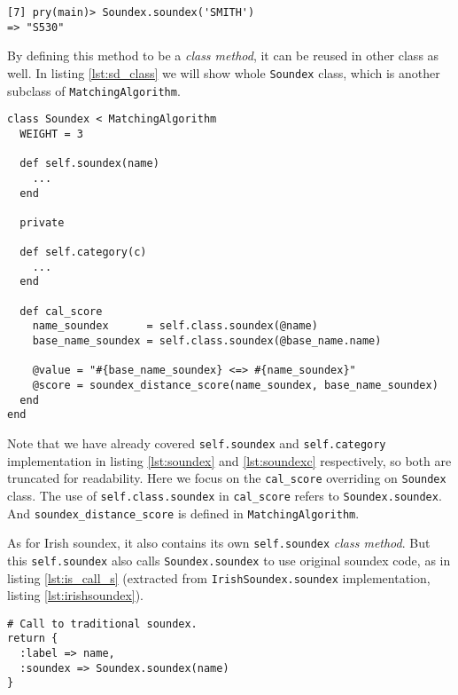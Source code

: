 \begin{minipage}{\linewidth}
\begin{lstlisting}[label={lst:classmethod}, caption={Calling class method \emph{Soundex.soundex}.}]
[7] pry(main)> Soundex.soundex('SMITH')
=> "S530"
\end{lstlisting}
\end{minipage}

By defining this method to be a \emph{class method}, it can be reused
in other class as well. In listing \ref{lst:sd_class} we will show whole
\texttt{Soundex} class, which is another subclass of \texttt{MatchingAlgorithm}.

\begin{minipage}{\linewidth}
\begin{lstlisting}[label={lst:sd_class}, caption={\texttt{Soundex} class.}]
class Soundex < MatchingAlgorithm
  WEIGHT = 3

  def self.soundex(name)
    ...
  end

  private

  def self.category(c)
    ...
  end

  def cal_score
    name_soundex      = self.class.soundex(@name)
    base_name_soundex = self.class.soundex(@base_name.name)

    @value = "#{base_name_soundex} <=> #{name_soundex}"
    @score = soundex_distance_score(name_soundex, base_name_soundex)
  end
end
\end{lstlisting}
\end{minipage}

Note that we have already covered \texttt{self.soundex} and \texttt{self.category} implementation
in listing \ref{lst:soundex} and \ref{lst:soundexc} respectively, so both
are truncated for readability. Here we focus on the \texttt{cal\_score} overriding
on \texttt{Soundex} class. The use of \texttt{self.class.soundex} in \texttt{cal\_score}
refers to \texttt{Soundex.soundex}. And \texttt{soundex\_distance\_score}
is defined in \texttt{MatchingAlgorithm}.

As for Irish soundex, it also contains its own \texttt{self.soundex}
\emph{class method}. But this \texttt{self.soundex} also calls \texttt{Soundex.soundex}
to use original soundex code, as in listing \ref{lst:is_call_s} (extracted from
\texttt{IrishSoundex.soundex} implementation, listing \ref{lst:irishsoundex}).

\begin{minipage}{\linewidth}
\begin{lstlisting}[label={lst:is_call_s}, caption={\texttt{IrishSoundex.soundex} calls to \texttt{Soundex.soundex}.}]
# Call to traditional soundex.
return {
  :label => name,
  :soundex => Soundex.soundex(name)
}
\end{lstlisting}
\end{minipage}

